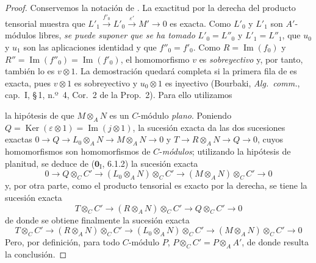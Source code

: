 \begin{proof}
Conservemos la notación de . La exactitud por la derecha del producto
tensorial muestra que
$L'_1\xrightarrow{f'_0}L'_0\xrightarrow{\varepsilon'}M'\to0$
es exacta. Como $L'_0$ y $L'_1$ son
$A'$-módulos libres, \emph{se puede suponer que se ha tomado}
$L'_0=L''_0$ y
$L'_1=L''_1$, que $u_0$ y $u_1$ son las aplicaciones
identidad y que $f''_0=f'_0$. Como
$R=\operatorname{Im}(f_0)$ y
$R''=\operatorname{Im}(f''_0)=
\operatorname{Im}(f'_0)$, el
homomorfismo $v$ es \emph{sobreyectivo} y, por tanto, también lo es $v\otimes1$. La demostración
quedará completa si la primera fila de
 es exacta, pues $v\otimes1$ es
sobreyectivo y $u_0\otimes1$ es inyectivo (Bourbaki,
\emph{Alg.\ comm.}, cap.~I, \S\,1, n.º~4, Cor.~2 de la Prop.~2). Para ello
utilizamos


la hipótesis de que $M\otimes_AN$ es un $C$-módulo \emph{plano}. Poniendo $Q=\operatorname{Ker}(\varepsilon\otimes1)=\operatorname{Im}(j\otimes1)$, la sucesión exacta  da las dos sucesiones exactas $0\to Q\to L_0\otimes_AN\to M\otimes_AN\to0$ y $T\to R\otimes_AN\to Q\to0$, cuyos homomorfismos son homomorfismos de $C$-\emph{módulos}; utilizando la hipótesis de planitud, se deduce de ($\mathbf 0_{\mathrm I}$, 6.1.2) la sucesión exacta
\[
0\to Q\otimes_CC'\to(L_0\otimes_AN)\otimes_CC'
\to(M\otimes_AN)\otimes_CC'\to0
\]
y, por otra parte, como el producto tensorial es exacto por la derecha, se tiene la sucesión exacta
\[
T\otimes_CC'\to(R\otimes_AN)\otimes_CC'\to Q\otimes_CC'\to0
\]
de donde se obtiene finalmente la sucesión exacta
\[
T\otimes_CC'\to(R\otimes_AN)\otimes_CC'\to
(L_0\otimes_AN)\otimes_CC'\to(M\otimes_AN)\otimes_CC'\to0
\]
Pero, por definición, para todo $C$-módulo $P$, $P\otimes_CC'=P\otimes_AA'$, de donde resulta la conclusión.
\end{proof}

